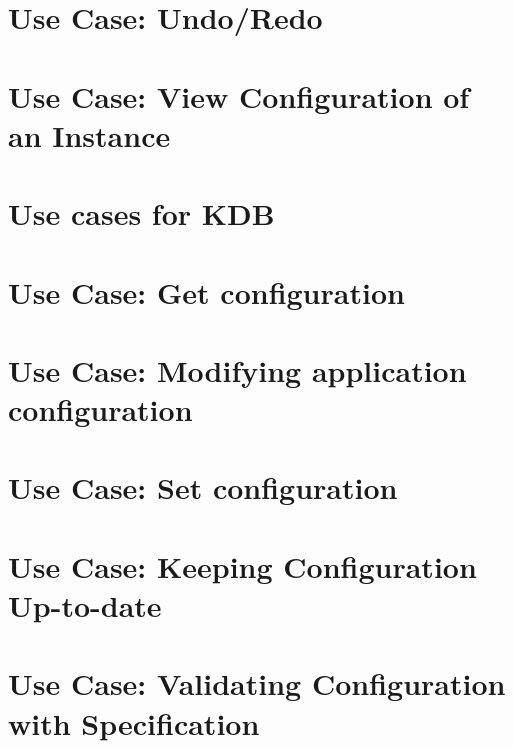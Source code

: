 \let\mypdfximage\pdfximage\def\pdfximage{\immediate\mypdfximage}\documentclass[twoside]{book}
\newcommand{\+}{\discretionary{\mbox{\scriptsize$\hookleftarrow$}}{}{}}
\begin{document}
\chapter{Use Case\+: Undo/\+Redo}
\label{doc_usecases_elektra_web_UC_undo_redo_md}

\chapter{Use Case\+: View Configuration of an Instance}
\label{doc_usecases_elektra_web_UC_view_config_md}

\chapter{Use cases for KDB}
\label{doc_usecases_kdb_README_md}

\chapter{Use Case\+: Get configuration}
\label{doc_usecases_kdb_UC_get_config_md}

\chapter{Use Case\+: Modifying application configuration}
\label{doc_usecases_kdb_UC_modify_config_md}

\chapter{Use Case\+: Set configuration}
\label{doc_usecases_kdb_UC_set_config_md}

\chapter{Use Case\+: Keeping Configuration Up-\/to-\/date}
\label{doc_usecases_kdb_UC_uptodate_config_md}

\chapter{Use Case\+: Validating Configuration with Specification}
\label{doc_usecases_kdb_UC_validate_config_md}

\end{document}
